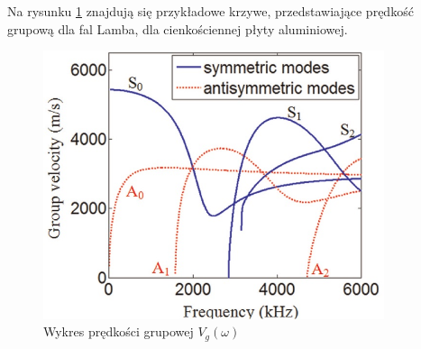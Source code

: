 Na rysunku \ref{fig:predkosc_grupow_wykres} znajdują się przykładowe krzywe, przedstawiające prędkość grupową dla fal Lamba, dla cienkościennej płyty aluminiowej.

\begin{figure}[h]
\centering
\includegraphics[width=10cm]{Zdjecia/2/predkosc_grupowa_wykres}
\caption{Wykres prędkości grupowej \(V_g(\omega)\) \cite{bartek_tian}}
\label{fig:predkosc_grupow_wykres}
\end{figure}







%





















